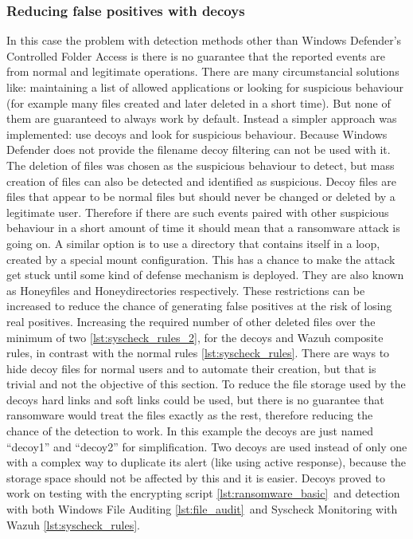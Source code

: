 \subsubsection{Reducing false positives with decoys}
In this case the problem with detection methods other than Windows Defender's Controlled Folder Access is there is no guarantee that the reported events are from normal and legitimate operations.
There are many circumstancial solutions like: maintaining a list of allowed applications or looking for suspicious behaviour (for example many files created and later deleted in a short time).
But none of them are guaranteed to always work by default.
Instead a simpler approach was implemented: use decoys and look for suspicious behaviour.
Because Windows Defender does not provide the filename decoy filtering can not be used with it.
\linej
The deletion of files was chosen as the suspicious behaviour to detect, but mass creation of files can also be detected and identified as suspicious.
\linej
\linej
Decoy files are files that appear to be normal files but should never be changed or deleted by a legitimate user.
Therefore if there are such events paired with other suspicious behaviour in a short amount of time it should mean that a ransomware attack is going on.
\linej
A similar option is to use a directory that contains itself in a loop, created by a special mount configuration.
This has a chance to make the attack get stuck until some kind of defense mechanism is deployed.
They are also known as Honeyfiles and Honeydirectories respectively\cite{ransomware_oReilly}.
\linej
These restrictions can be increased to reduce the chance of generating false positives at the risk of losing real positives.
Increasing the required number of other deleted files over the minimum of two \ref{lst:syscheck_rules_2}, for the decoys and Wazuh composite rules, in contrast with the normal rules \ref{lst:syscheck_rules}.
\linej
There are ways to hide decoy files for normal users and to automate their creation, but that is trivial and not the objective of this section.
To reduce the file storage used by the decoys hard links and soft links could be used, but there is no guarantee that ransomware would treat the files exactly as the rest, therefore reducing the chance of the detection to work.
\linej
In this example the decoys are just named ``decoy1'' and ``decoy2'' for simplification.
Two decoys are used instead of only one with a complex way to duplicate its alert (like using active response), because the storage space should not be affected by this and it is easier.
\linej
\linej
Decoys proved to work on testing with the encrypting script \ref{lst:ransomware_basic}\ and detection with both Windows File Auditing \ref{lst:file_audit}\ and Syscheck Monitoring with Wazuh \ref{lst:syscheck_rules}.

